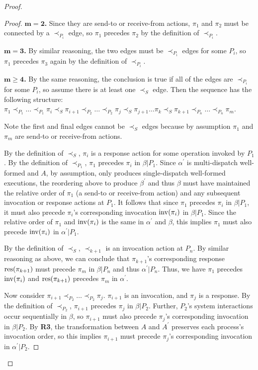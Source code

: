 \begin{proof}
\begin{proof}
      $\mathbf{m=2}$\textbf{.} Since they are send-to or receive-from actions, $\pi_1$ and $\pi_2$ must be connected by a $\prec_{P_i}$ edge, so $\pi_1$ precedes $\pi_2$ by the definition of $\prec_{P_i}$.

      $\mathbf{m=3}$\textbf{.} By similar reasoning, the two edges must be $\prec_{P_i}$ edges for some $P_i$, so $\pi_1$ precedes $\pi_3$ again by the definition of $\prec_{P_i}$.

      $\mathbf{m \geq 4}$\textbf{.} By the same reasoning, the conclusion is true if all of the edges are $\prec_{P_i}$ for some $P_i$, so assume there is at least one $\prec_S$ edge.
      Then the sequence has the following structure:
      $\pi_1 \prec_{P_1} \ldots \prec_{P_1} \pi_i \prec_S \pi_{i+1} \prec_{P_2} \ldots \prec_{P_2} \pi_j \prec_S \pi_{j+1} \ldots \pi_k \prec_S \pi_{k+1} \prec_{P_n} \ldots \prec_{P_n} \pi_m$.

      Note the first and final edges cannot be $\prec_S$ edges because by assumption $\pi_1$ and $\pi_m$ are send-to or receive-from actions.

      By the definition of $\prec_S$, $\pi_i$ is a response action for some operation invoked by $P_1$. By the definition of $\prec_{P_1}$, $\pi_1$ precedes $\pi_i$ in $\beta | P_1$. Since $\alpha^\prime$ is multi-dispatch well-formed and $A$, by assumption, only produces single-dispatch well-formed executions, the reordering above to produce $\beta^\prime$ and thus $\beta$ must have maintained the relative order of $\pi_1$ (a send-to or receive-from action) and any subsequent invocation or response actions at $P_1$. It follows that since $\pi_1$ precedes $\pi_i$ in $\beta | P_1$, it must also precede $\pi_i$’s corresponding invocation $\operatorname{inv}(\pi_i)$ in $\beta | P_1$. Since the relative order of $\pi_1$ and $\operatorname{inv}(\pi_i)$ is the same in $\alpha^\prime$ and $\beta$, this implies $\pi_1$ must also precede $\operatorname{inv}(\pi_i)$ in $\alpha^\prime | P_1$.

      By the definition of $\prec_S$, $\prec_{k+1}$ is an invocation action at $P_n$. By similar reasoning as above, we can conclude that $\pi_{k+1}$’s corresponding response $\operatorname{\operatorname{res}}(\pi_{k+1})$ must precede $\pi_m$ in $\beta | P_n$ and thus $\alpha^\prime | P_n$. Thus, we have $\pi_1$ precedes $\operatorname{inv}(\pi_i)$ and $\operatorname{\operatorname{res}}(\pi_{k+1})$ precedes $\pi_m$ in $\alpha^\prime$.

      Now consider $\pi_{i+1} \prec_{P_2} \ldots \prec_{P_2} \pi_j$. $\pi_{i+1}$ is an invocation, and $\pi_j$ is a response. By the definition of $\prec_{P_2}$, $\pi_{i+1}$ precedes $\pi_j$ in $\beta | P_2$. Further, $P_2$’s system interactions occur sequentially in $\beta$, so $\pi_{i+1}$ must also precede $\pi_j$’s corresponding invocation in $\beta | P_2$. By \textbf{R3}, the transformation between $A$ and $A^\prime$ preserves each process’s invocation order, so this implies $\pi_{i+1}$ must precede $\pi_j$’s corresponding invocation in $\alpha^\prime | P_2$.


\end{proof}
\end{proof}
